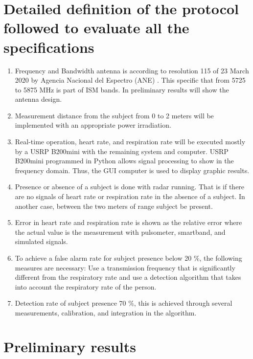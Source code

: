 \documentclass[lettersize,journal]{IEEEtran}
\begin{document}
\section{Detailed definition of the protocol followed to evaluate all the specifications}

\begin{enumerate}
    \item Frequency and Bandwidth antenna is according to resolution 115 of 23 March 2020  by Agencia Nacional del Espectro (ANE) \cite{ANERes105}. This specific that from 5725 to 5875 MHz  is part of ISM bands. In preliminary results will show the antenna design. 

    
    \item Measurement distance from the subject from 0 to 2 meters will be implemented with an appropriate power irradiation. 

    \item Real-time operation, heart rate, and respiration rate will be executed mostly by a USRP B200mini with the remaining system and computer. USRP B200mini programmed in Python allows signal processing to show in the frequency domain. Thus, the GUI computer is used to display graphic results.

    \item Presence or absence of a subject is done with radar running. That is if there are no signals of heart rate or respiration rate in the absence of a subject. In another case, between the two meters of range subject be present. 

    \item Error in heart rate and respiration rate is shown as the relative error where the actual value is the measurement with pulsometer, smartband, and simulated signals. 
     
    \item To achieve a false alarm rate for subject presence below 20 \%, the following measures are necessary: Use a transmission frequency that is significantly different from the respiratory rate and use a detection algorithm that takes into account the respiratory rate of the person. 

    \item Detection rate of subject presence 70 \%, this is achieved through several measurements, calibration, and integration in the algorithm.
    
\end{enumerate}


\section{Preliminary results}
\label{sec:prel_res}
\end{document}
